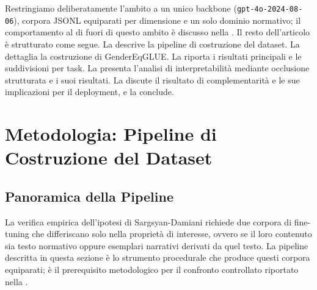 \documentclass[pdflatex, sn-apa]{sn-jnl}%
\theoremstyle{thmstyleone}%
\theoremstyle{thmstyletwo}%
\theoremstyle{thmstylethree}%
\begin{document}
Restringiamo deliberatamente l'ambito a un unico backbone
(\texttt{gpt-4o-2024-08-06}), corpora JSONL equiparati per dimensione e un solo
dominio normativo; il comportamento al di fuori di questo ambito è discusso nella
. Il resto dell'articolo è strutturato come segue. La
 descrive la pipeline di costruzione del dataset. La
 dettaglia la costruzione di GenderEqGLUE. La
 riporta i risultati principali e le suddivisioni per task. La
 presenta l'analisi di interpretabilità mediante occlusione
strutturata e i suoi risultati. La
 discute il risultato di complementarità e le sue
implicazioni per il deployment, e la  conclude.

\section{Metodologia: Pipeline di Costruzione del Dataset}
\label{sec:method}

\subsection{Panoramica della Pipeline}
\label{sec:method:overview}

La verifica empirica dell'ipotesi di Sargsyan-Damiani richiede due corpora di
fine-tuning che differiscano solo nella proprietà di interesse, ovvero se il loro
contenuto sia testo normativo oppure esemplari narrativi derivati da quel testo.
La pipeline descritta in questa sezione è lo strumento procedurale che produce
questi corpora equiparati; è il prerequisito metodologico per il confronto
controllato riportato nella .
\end{document}
